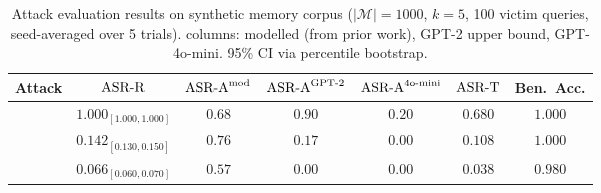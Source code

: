 \begin{table}[t]
\centering
\small
\caption{Attack evaluation results on synthetic memory corpus
  ($|\mathcal{M}|=1000$, $k=5$, 100 victim queries, seed-averaged over 5 trials).
  \asra{} columns: modelled (from prior work), GPT-2 upper bound, GPT-4o-mini.
  95\% CI via percentile bootstrap.}
\label{tab:attack_results}
\begin{tabular}{lcccccc}
\toprule
Attack & $\text{ASR-R}$ & $\text{ASR-A}^{\text{mod}}$ & $\text{ASR-A}^{\text{GPT-2}}$ & $\text{ASR-A}^{\text{4o-mini}}$ & $\text{ASR-T}$ & Ben.\ Acc. \\
\midrule
\agentpoison{} \citep{chen2024agentpoison} & $1.000_{[1.000,1.000]}$ & $0.68$ & $0.90$ & $0.20$ & $0.680$ & $1.000$ \\
\minja{} \citep{dong2025minja} & $0.142_{[0.130,0.150]}$ & $0.76$ & $0.17$ & $0.00$ & $0.108$ & $1.000$ \\
\injecmem{} \citep{injecmem2026} & $0.066_{[0.060,0.070]}$ & $0.57$ & $0.00$ & $0.00$ & $0.038$ & $0.980$ \\
\bottomrule
\end{tabular}
\end{table}
